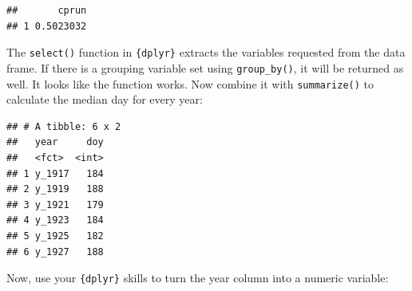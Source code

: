 \documentclass[]{book}
\newenvironment{Shaded}{\begin{snugshade}}{\end{snugshade}}
\newcommand{\KeywordTok}[1]{\textcolor[rgb]{0.13,0.29,0.53}{\textbf{#1}}}
\newcommand{\DataTypeTok}[1]{\textcolor[rgb]{0.13,0.29,0.53}{#1}}
\newcommand{\StringTok}[1]{\textcolor[rgb]{0.31,0.60,0.02}{#1}}
\newcommand{\CommentTok}[1]{\textcolor[rgb]{0.56,0.35,0.01}{\textit{#1}}}
\newcommand{\OperatorTok}[1]{\textcolor[rgb]{0.81,0.36,0.00}{\textbf{#1}}}
\newcommand{\NormalTok}[1]{#1}
\theoremstyle{definition}
\theoremstyle{definition}
\theoremstyle{definition}
\theoremstyle{remark}
\begin{document}
\begin{Shaded}
\end{Shaded}

\begin{verbatim}
##       cprun
## 1 0.5023032
\end{verbatim}

The \texttt{select()} function in \texttt{\{dplyr\}} extracts the
variables requested from the data frame. If there is a grouping variable
set using \texttt{group\_by()}, it will be returned as well. It looks
like the function works. Now combine it with \texttt{summarize()} to
calculate the median day for every year:

\begin{Shaded}
\end{Shaded}

\begin{verbatim}
## # A tibble: 6 x 2
##   year     doy
##   <fct>  <int>
## 1 y_1917   184
## 2 y_1919   188
## 3 y_1921   179
## 4 y_1923   184
## 5 y_1925   182
## 6 y_1927   188
\end{verbatim}

Now, use your \texttt{\{dplyr\}} skills to turn the year column into a
numeric variable:
\end{document}

